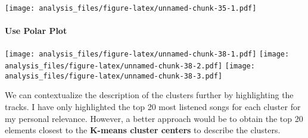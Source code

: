 \documentclass[
]{article}
\newenvironment{Shaded}{\begin{snugshade}}{\end{snugshade}}
\newcommand{\AttributeTok}[1]{\textcolor[rgb]{0.13,0.29,0.53}{#1}}
\newcommand{\DecValTok}[1]{\textcolor[rgb]{0.00,0.00,0.81}{#1}}
\newcommand{\FunctionTok}[1]{\textcolor[rgb]{0.13,0.29,0.53}{\textbf{#1}}}
\newcommand{\NormalTok}[1]{#1}
\newcommand{\OtherTok}[1]{\textcolor[rgb]{0.56,0.35,0.01}{#1}}
\newcommand{\SpecialCharTok}[1]{\textcolor[rgb]{0.81,0.36,0.00}{\textbf{#1}}}
\newcommand{\StringTok}[1]{\textcolor[rgb]{0.31,0.60,0.02}{#1}}
\begin{document}
\begin{Shaded}
\end{Shaded}

\texttt{[image: analysis\_files/figure-latex/unnamed-chunk-35-1.pdf]}

\hypertarget{use-polar-plot}{%
\paragraph{Use Polar Plot}\label{use-polar-plot}}

\texttt{[image: analysis\_files/figure-latex/unnamed-chunk-38-1.pdf]}
\texttt{[image: analysis\_files/figure-latex/unnamed-chunk-38-2.pdf]}
\texttt{[image: analysis\_files/figure-latex/unnamed-chunk-38-3.pdf]}

We can contextualize the description of the clusters further by
highlighting the tracks. I have only highlighted the top 20 most
listened songs for each cluster for my personal relevance. However, a
better approach would be to obtain the top 20 elements closest to the
\textbf{K-means cluster centers} to describe the clusters.
\end{document}
